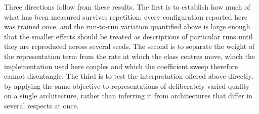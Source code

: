 
Three directions follow from these results. The first is to establish how much
of what has been measured survives repetition: every configuration reported here
was trained once, and the run-to-run variation quantified above is large enough
that the smaller effects should be treated as descriptions of particular runs
until they are reproduced across several seeds. The second is to separate the
weight of the representation term from the rate at which the class centres move,
which the implementation used here couples and which the coefficient sweep
therefore cannot disentangle. The third is to test the interpretation offered
above directly, by applying the same objective to representations of
deliberately varied quality on a single architecture, rather than inferring it
from architectures that differ in several respects at once.
